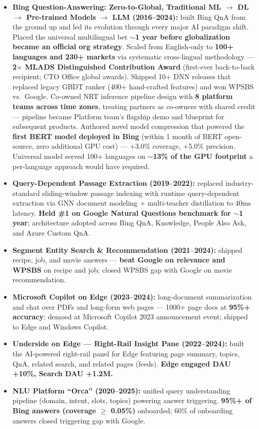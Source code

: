 \documentclass[10.5pt,letterpaper]{article}
\begin{document}
\begin{itemize}
  \item \textbf{Bing Question-Answering: Zero-to-Global, Traditional ML $\to$ DL $\to$ Pre-trained Models $\to$ LLM (2016--2024):} built Bing QnA from the ground up and led its evolution through every major AI paradigm shift. Placed the universal multilingual bet \textbf{$\sim$1 year before globalization became an official org strategy}. Scaled from English-only to \textbf{100+ languages and 230+ markets} via systematic cross-lingual methodology — \textbf{2$\times$ MLADS Distinguished Contribution Award} (first-ever back-to-back recipient; CTO Office global awards). Shipped 10+ DNN releases that replaced legacy GBDT ranker (400+ hand-crafted features) and won WPSBS vs.\ Google. Co-owned NRT inference pipeline design with \textbf{8 platform teams across time zones}, treating partners as co-owners with shared credit — pipeline became Platform team's flagship demo and blueprint for subsequent products. Authored novel model compression that powered the \textbf{first BERT model deployed in Bing} (within 1 month of BERT open-source, zero additional GPU cost) — +3.0\% coverage, +5.0\% precision. Universal model served 100+ languages on \textbf{$\sim$13\% of the GPU footprint} a per-language approach would have required.
  \item \textbf{Query-Dependent Passage Extraction (2019--2022):} replaced industry-standard sliding-window passage indexing with runtime query-dependent extraction via GNN document modeling + multi-teacher distillation to 40ms latency. \textbf{Held \#1 on Google Natural Questions benchmark for $\sim$1 year}; architecture adopted across Bing QnA, Knowledge, People Also Ask, and Azure Custom QnA.
  \item \textbf{Segment Entity Search \& Recommendation (2021--2024):} shipped recipe, job, and movie answers — \textbf{beat Google on relevance and WPSBS} on recipe and job; closed WPSBS gap with Google on movie recommendation.
  \item \textbf{Microsoft Copilot on Edge (2023--2024):} long-document summarization and chat over PDFs and long-form web pages — 1000+ page docs at \textbf{95\%+ accuracy}; demoed at Microsoft Copilot 2023 announcement event; shipped to Edge and Windows Copilot.
  \item \textbf{Underside on Edge --- Right-Rail Insight Pane (2022--2024):} built the AI-powered right-rail panel for Edge featuring page summary, topics, QnA, related search, and related pages (feeds). \textbf{Edge engaged DAU +10\%, Search DAU +1.2M.}
  \item \textbf{NLU Platform ``Orca'' (2020--2025):} unified query understanding pipeline (domain, intent, slots, topics) powering answer triggering. \textbf{95\%+ of Bing answers (coverage $\ge$ 0.05\%)} onboarded; 60\% of onboarding answers closed triggering gap with Google.
\end{itemize}
\end{document}
